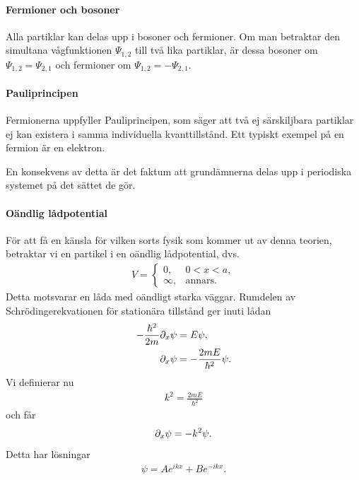 \paragraph{Fermioner och bosoner}
Alla partiklar kan delas upp i bosoner och fermioner. Om man betraktar den simultana vågfunktionen $\Psi_{1, 2}$ till två lika partiklar, är dessa bosoner om $\Psi_{1, 2} = \Psi_{2, 1}$ och fermioner om $\Psi_{1, 2} = -\Psi_{2, 1}$.

\paragraph{Pauliprincipen}
Fermionerna uppfyller Pauliprincipen, som säger att två ej särskiljbara partiklar ej kan existera i samma individuella kvanttillstånd. Ett typiskt exempel på en fermion är en elektron.

En konsekvens av detta är det faktum att grundämnerna delas upp i periodiska systemet på det sättet de gör.

\paragraph{Oändlig lådpotential}
För att få en känsla för vilken sorts fysik som kommer ut av denna teorien, betraktar vi en partikel i en oändlig lådpotential, dvs.
\begin{align*}
	V = 
	\begin{cases}
		0,      &0 < x < a, \\
		\infty, &\text{annars.}
	\end{cases}
\end{align*}
Detta motsvarar en låda med oändligt starka väggar. Rumdelen av Schrödingerekvationen för stationära tillstånd ger inuti lådan
\begin{align*}
	-\frac{\hbar^{2}}{2m}\partial_{x}\psi &= E\psi, \\
	\partial_{x}\psi                      &= -\frac{2mE}{\hbar^{2}}\psi.
\end{align*}
Vi definierar nu
\begin{align*}
	k^{2} = \frac{2mE}{\hbar^{2}}
\end{align*}
och får
\begin{align*}
	\partial_{x}\psi = -k^{2}\psi.
\end{align*}
Detta har lösningar
\begin{align*}
	\psi = Ae^{ikx} + Be^{-ikx}.
\end{align*}

